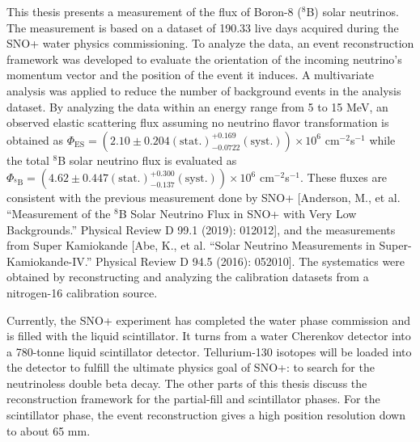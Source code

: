 \begin{doublespacing}
This thesis presents a measurement of the flux of Boron-8 ($^8$B) solar neutrinos. The measurement is based on a dataset of 190.33 live days acquired during the SNO+ water physics commissioning. To analyze the data, an event reconstruction framework was developed to evaluate the orientation of the incoming neutrino's momentum vector and the position of the event it induces. A multivariate analysis was applied to reduce the number of background events in the analysis dataset. By analyzing the data within an energy range from 5 to 15 MeV, an observed elastic scattering flux assuming no neutrino flavor transformation is obtained as $\Phi_{\mathrm{ES}}=(2.10 \pm 0.204 \mathrm{(stat.)}^{+0.169}_{-0.0722}\mathrm{(syst.)})\times10^6$ cm$^{-2}$s$^{-1}$ while the total $^8$B solar neutrino flux is evaluated as $\Phi_{\mathrm{^8B}}=(4.62 \pm 0.447 \mathrm{(stat.)}^{+0.300}_{-0.137}\mathrm{(syst.)})\times10^6$ cm$^{-2}$s$^{-1}$. These fluxes are consistent with the previous measurement done by SNO+ [Anderson, M., et al. ``Measurement of the $^8$B Solar Neutrino Flux in SNO+ with Very Low Backgrounds.'' Physical Review D 99.1 (2019): 012012], and the measurements from Super Kamiokande [Abe, K., et al. ``Solar Neutrino Measurements in Super-Kamiokande-IV.'' Physical Review D 94.5 (2016): 052010]. The systematics were obtained by reconstructing and analyzing the calibration datasets from a nitrogen-16 calibration source.

Currently, the SNO+ experiment has completed the water phase commission and is filled with the liquid scintillator. It turns from a water Cherenkov detector into a 780-tonne liquid scintillator detector. Tellurium-130 isotopes will be loaded into the detector to fulfill the ultimate physics goal of SNO+: to search for the neutrinoless double beta decay. The other parts of this thesis discuss the reconstruction framework for the partial-fill and scintillator phases. For the scintillator phase, the event reconstruction gives a high position resolution down to about 65 mm.


\end{doublespacing}